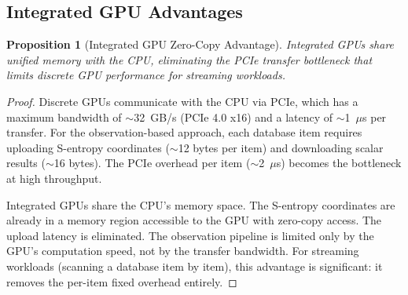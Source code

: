 \documentclass[11pt,twocolumn,a4paper]{article}
\newtheorem{proposition}[theorem]{Proposition}
\theoremstyle{definition}
\theoremstyle{remark}
\begin{document}
\subsection{Integrated GPU Advantages}

\begin{proposition}[Integrated GPU Zero-Copy Advantage]
\label{prop:zero_copy}
Integrated GPUs share unified memory with the CPU, eliminating the PCIe transfer bottleneck that limits discrete GPU performance for streaming workloads.
\end{proposition}

\begin{proof}
Discrete GPUs communicate with the CPU via PCIe, which has a maximum bandwidth of $\sim$32~GB/s (PCIe 4.0 x16) and a latency of $\sim$1~$\mu$s per transfer. For the observation-based approach, each database item requires uploading S-entropy coordinates ($\sim$12 bytes per item) and downloading scalar results ($\sim$16 bytes). The PCIe overhead per item ($\sim$2~$\mu$s) becomes the bottleneck at high throughput.

Integrated GPUs share the CPU's memory space. The S-entropy coordinates are already in a memory region accessible to the GPU with zero-copy access. The upload latency is eliminated. The observation pipeline is limited only by the GPU's computation speed, not by the transfer bandwidth. For streaming workloads (scanning a database item by item), this advantage is significant: it removes the per-item fixed overhead entirely.
\end{proof}
\end{document}
